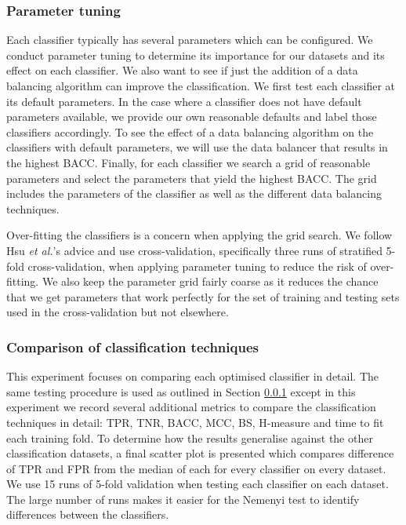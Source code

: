 \documentclass{sig-alternate-05-2015}
\begin{document}
	\subsubsection{Parameter tuning}
	\label{parameter_tuning}
	Each classifier typically has several parameters which can be configured. We conduct parameter tuning to determine its importance for our datasets and its effect on each classifier. We also want to see if just the addition of a data balancing algorithm can improve the classification. We first test each classifier at its default parameters. In the case where a classifier does not have default parameters available, we provide our own reasonable defaults and label those classifiers accordingly. To see the effect of a data balancing algorithm on the classifiers with default parameters, we will use the data balancer that results in the highest BACC. Finally, for each classifier we search a grid of reasonable parameters and select the parameters that yield the highest BACC. The grid includes the parameters of the classifier as well as the different data balancing techniques.
	
	Over-fitting the classifiers is a concern when applying the grid search. We follow Hsu \textit{et al.}'s \cite{hsu2003practical} advice and use cross-validation, specifically three runs of stratified 5-fold cross-validation, when applying parameter tuning to reduce the risk of over-fitting. We also keep the parameter grid fairly coarse as it reduces the chance that we get parameters that work perfectly for the set of training and testing sets used in the cross-validation but not elsewhere.
	
	\subsubsection{Comparison of classification techniques}
	\label{comparision_of_classification_technique}
	This experiment focuses on comparing each optimised classifier in detail. The same testing procedure is used as outlined in Section \ref{parameter_tuning} except in this experiment we record several additional metrics to compare the classification techniques in detail: TPR, TNR, BACC, MCC, BS, H-measure and time to fit each training fold. To determine how the results generalise against the other classification datasets, a final scatter plot is presented which compares difference of TPR and FPR from the median of each for every classifier on every dataset. We use 15 runs of 5-fold validation when testing each classifier on each dataset. The large number of runs makes it easier for the Nemenyi test to identify differences between the classifiers.
	
\end{document}
